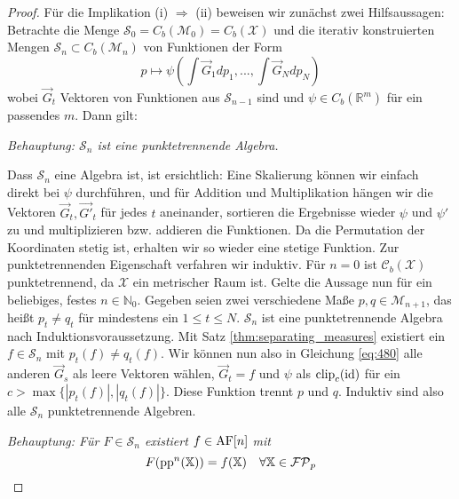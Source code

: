 \begin{proof}
        Für die Implikation (i) $\Rightarrow$ (ii) beweisen wir zunächst zwei Hilfsaussagen: Betrachte die Menge $\mathcal{S}_0= C_b(\mathcal{M}_0) = C_b(\mathcal{X})$ und die iterativ konstruierten Mengen $\mathcal{S}_n \subset C_b(\mathcal{M}_n)$ von Funktionen der Form
        \begin{equation}\label{eq:480}
            p \mapsto \psi\left( \int \vec{G}_1dp_1, ..., \int \vec{G}_N dp_N\right)
        \end{equation}
        wobei $\vec{G}_t$ Vektoren von Funktionen aus $\mathcal{S}_{n-1}$ sind und $\psi \in C_b(\mathbb{R}^m)$ für ein passendes $m$. Dann gilt: 

        \emph{Behauptung: $\mathcal{S}_n$ ist eine punktetrennende Algebra.}

        Dass $\mathcal{S}_n$ eine Algebra ist, ist ersichtlich: Eine Skalierung können wir einfach direkt bei $\psi$ durchführen, und für Addition und Multiplikation hängen wir die Vektoren $\vec{G}_t, \vec{G'}_t$ für jedes $t$ aneinander, sortieren die Ergebnisse wieder $\psi$ und $\psi'$ zu und multiplizieren bzw. addieren die Funktionen. Da die Permutation der Koordinaten stetig ist, erhalten wir so wieder eine stetige Funktion. Zur punktetrennenden Eigenschaft verfahren wir induktiv. Für $n=0$ ist $\mathcal{C}_b(\mathcal{X})$ punktetrennend, da $\mathcal{X}$ ein metrischer Raum ist. Gelte die Aussage nun für ein beliebiges, festes $n \in \mathbb{N}_0$. Gegeben seien zwei verschiedene Maße $p,q \in \mathcal{M}_{n+1}$, das heißt $p_t\neq q_t$ für mindestens ein $1\leq t\leq N$. $\mathcal{S}_{n}$ ist eine punktetrennende Algebra nach Induktionsvoraussetzung. Mit Satz \ref{thm:separating_measures} existiert ein $f \in \mathcal{S}_{n}$ mit $p_t(f) \neq q_t(f)$. Wir können nun also in Gleichung \ref{eq:480} alle anderen $\vec{G}_s$ als leere Vektoren wählen, $\vec{G}_t = f$ und $\psi$ als $\operatorname{clip}_c(\operatorname{id})$ für ein $c > \max\{|p_t(f)|, |q_t(f)|\}$. Diese Funktion trennt $p$ und $q$. Induktiv sind also alle $\mathcal{S}_n$ punktetrennende Algebren.

        \emph{Behauptung: Für $F\in \mathcal{S}_n$ existiert $f \in \operatorname{AF}[n]$ mit 
        $$F(\operatorname{pp}^n(\mathbb{X})) = f(\mathbb{X}) \quad \forall \mathbb{X} \in \mathcal{FP}_p$$}


\end{proof}
